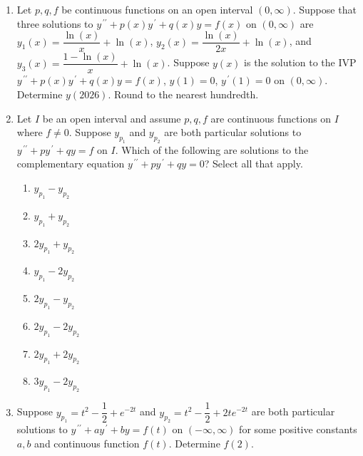 \documentclass{ximera}
\begin{document}
\begin{enumerate}[label=(\arabic*)]

\item Let $p,q,f$ be continuous functions on an open interval $(0,\infty)$. Suppose that three solutions to $y^{\,\prime\prime}+p(x)y^{\,\prime}+q(x)y=f(x)$ on $(0,\infty)$ are \\$y_1(x)=\dfrac{\ln{(x)}}{x}+\ln{(x)}$, $y_2(x)=\dfrac{\ln{(x)}}{2x}+\ln{(x)}$, and \\$y_3(x)=\dfrac{1-\ln{(x)}}{x}+\ln{(x)}$.  Suppose $y(x)$ is the solution to the IVP $y^{\,\prime\prime}+p(x)y^{\,\prime}+q(x)y=f(x)$, $y(1)=0$, $y^{\,\prime}(1)=0$ on $(0,\infty)$.  Determine $y(2026)$.  Round to the nearest hundredth.







\newpage

\item Let $I$ be an open interval and assume $p,q,f$ are continuous functions on $I$ where $f\neq 0$.  Suppose $y_{p_1}$ and $y_{p_2}$ are both particular solutions to $y^{\,\prime\prime}+py^{\,\prime}+qy=f$ on $I$.  Which of the following are solutions to the complementary equation $y^{\,\prime\prime}+py^{\,\prime}+qy=0$?  Select all that apply.


\begin{enumerate}[label=(\alph*)]
\item $y_{p_1}-y_{p_2}$  %
\item $y_{p_1}+y_{p_2}$
\item $2y_{p_1}+y_{p_2}$
\item $y_{p_1}-2y_{p_2}$
\item $2y_{p_1}-y_{p_2}$
\item $2y_{p_1}-2y_{p_2}$ %
\item $2y_{p_1}+2y_{p_2}$
\item $3y_{p_1}-2y_{p_2}$
\end{enumerate}



\item  Suppose $y_{p_1}=t^2-\dfrac{1}{2}+e^{-2t}$ and $y_{p_2}=t^2-\dfrac{1}{2}+2te^{-2t}$ are both particular solutions to $y^{\,\prime\prime}+ay^{\,\prime}+by=f(t)$ on $(-\infty,\infty)$ for some positive constants $a,b$ and continuous function $f(t)$.  Determine $f(2)$.


\end{enumerate}
\end{document}
